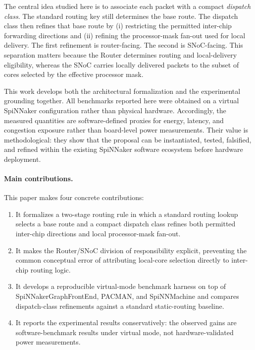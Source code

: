 \documentclass[11pt]{article}
\begin{document}
The central idea studied here is to associate each packet with a compact \emph{dispatch class}. The standard routing key still determines the base route. The dispatch class then refines that base route by (i) restricting the permitted inter-chip forwarding directions and (ii) refining the processor-mask fan-out used for local delivery. The first refinement is router-facing. The second is SNoC-facing. This separation matters because the Router determines routing and local-delivery eligibility, whereas the SNoC carries locally delivered packets to the subset of cores selected by the effective processor mask.

This work develops both the architectural formalization and the experimental grounding together. All benchmarks reported here were obtained on a virtual SpiNNaker configuration rather than physical hardware. Accordingly, the measured quantities are software-defined proxies for energy, latency, and congestion exposure rather than board-level power measurements. Their value is methodological: they show that the proposal can be instantiated, tested, falsified, and refined within the existing SpiNNaker software ecosystem before hardware deployment.

\paragraph{Main contributions.}
This paper makes four concrete contributions:
\begin{enumerate}[label=(C\arabic*)]
    \item It formalizes a two-stage routing rule in which a standard routing lookup selects a base route and a compact dispatch class refines both permitted inter-chip directions and local processor-mask fan-out.
    \item It makes the Router/SNoC division of responsibility explicit, preventing the common conceptual error of attributing local-core selection directly to inter-chip routing logic.
    \item It develops a reproducible virtual-mode benchmark harness on top of SpiNNakerGraphFrontEnd, PACMAN, and SpiNNMachine and compares dispatch-class refinements against a standard static-routing baseline.
    \item It reports the experimental results conservatively: the observed gains are software-benchmark results under virtual mode, not hardware-validated power measurements.
\end{enumerate}
\end{document}
